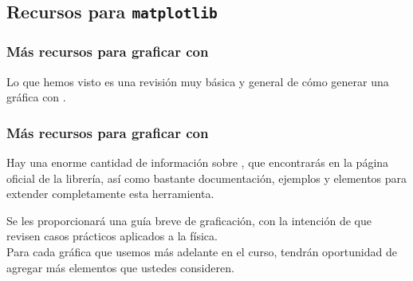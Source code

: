 \subsection{Recursos para \texttt{matplotlib}}
\begin{frame}
\frametitle{Más recursos para graficar con \python}
Lo que hemos visto es una revisión muy básica y general de cómo generar una gráfica con \python.
\end{frame}
\begin{frame}
\frametitle{Más recursos para graficar con \python}
Hay una enorme cantidad de información sobre , que encontrarás en la página oficial de la librería, así como bastante documentación, ejemplos y elementos para extender completamente esta herramienta.
\end{frame}
\begin{frame}
Se les proporcionará una guía breve de graficación, con la intención de que revisen casos prácticos aplicados a la física.
\\
\bigskip
Para cada gráfica que usemos más adelante en el curso, tendrán oportunidad de agregar más elementos que ustedes consideren.
\end{frame}

